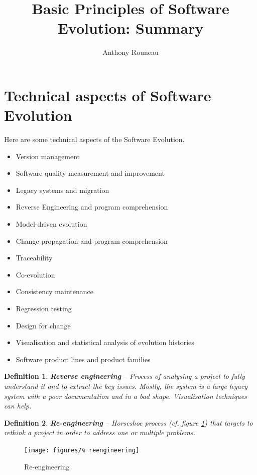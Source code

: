 \documentclass[a4paper,11pt]{report}
\title{Basic Principles of Software Evolution: Summary}
\author{Anthony Rouneau}
\newtheorem{definition}{Definition}
\begin{document}
\maketitle
\newpage
%
\section{Technical aspects of Software Evolution}
	Here are some technical aspects of the
		Software Evolution.
	\begin{itemize}
		\setlength{\itemsep}{0pt}		
		\setlength{\parskip}{0pt}		
		\setlength{\parsep}{0pt}	
		\item Version management
		\item Software quality measurement
			and improvement
		\item Legacy systems and migration
		\item Reverse Engineering and program
			comprehension
		\item Model-driven evolution
		\item Change propagation and program
			comprehension
		\item Traceability
		\item Co-evolution
		\item Consistency maintenance
		\item Regression testing
		\item Design for change
		\item Visualisation and statistical
			analysis of evolution histories
		\item Software product lines and 
			product families
	\end{itemize}
	\begin{definition}
		\textbf{Reverse engineering} --
			Process of analysing a project to fully
			understand it and to extract the key
			issues. Mostly, the system is a 
			large legacy system with a poor
			 documentation and in a bad shape.
			 Visualisation techniques can help.
	\end{definition}
	\begin{definition}
		\textbf{Re-engineering} -- 
			Horseshoe process (cf. figure
			\ref{fig:reengineering}) that targets
			to rethink a project in order to
			address one or multiple problems.
	\end{definition}
	\begin{figure}[H]
		\centering
		\texttt{[image: figures/\%
			reengineering]}
		\caption{Re-engineering}%
		\label{fig:reengineering}
	\end{figure}\noindent
\end{document}
